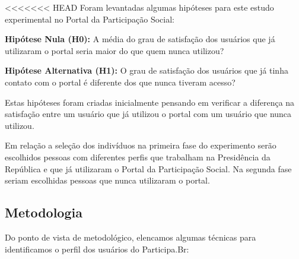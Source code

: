 <<<<<<< HEAD
Foram levantadas algumas hipóteses para este estudo experimental no Portal da Participação Social:

\textbf{Hipótese Nula (H0):} A média do grau de satisfação dos usuários que já utilizaram o portal seria maior do que quem nunca utilizou?

\textbf{Hipótese Alternativa (H1):} O grau de satisfação dos usuários que já tinha contato com o portal é diferente dos que nunca tiveram acesso?


Estas hipóteses foram criadas inicialmente pensando em verificar a diferença na satisfação entre um usuário que já utilizou o portal com um usuário que nunca utilizou.

Em relação a seleção dos indivíduos na primeira fase do experimento serão escolhidos pessoas com diferentes perfis que trabalham na Presidência da República e que já utilizaram o Portal da Participação Social. Na segunda fase seriam escolhidas pessoas que nunca utilizaram o portal.

\subsection{Metodologia}


Do ponto de vista de metodológico, elencamos algumas técnicas para identificamos o perfil dos usuários do Participa.Br:

